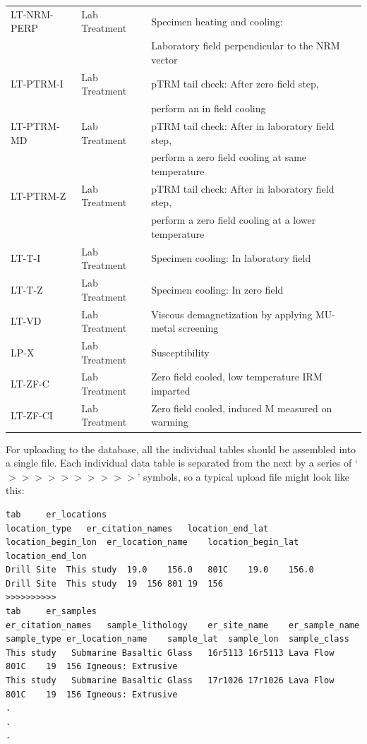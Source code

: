 \documentclass[11pt]{book}
\begin{document}
{\begin{tabular}{lll}
LT-NRM-PERP \qquad & Lab Treatment \qquad & Specimen heating and cooling: \\
\qquad &\qquad &Laboratory field perpendicular to the NRM vector\\
LT-PTRM-I \qquad & Lab Treatment \qquad & pTRM tail check: After zero field step, \\
\qquad &\qquad &perform an in field cooling\\
LT-PTRM-MD \qquad & Lab Treatment \qquad & pTRM tail check: After in laboratory field step, \\
\qquad &\qquad &perform a zero field cooling at same temperature\\
LT-PTRM-Z \qquad & Lab Treatment \qquad & pTRM tail check: After in laboratory field step,\\
\qquad &\qquad & perform a zero field cooling at a lower temperature\\
LT-T-I \qquad & Lab Treatment \qquad & Specimen cooling: In laboratory field\\
LT-T-Z \qquad & Lab Treatment \qquad & Specimen cooling: In zero field\\
LT-VD \qquad & Lab Treatment \qquad & Viscous demagnetization by applying MU-metal screening\\
LP-X \qquad & Lab Treatment \qquad & Susceptibility\\
LT-ZF-C \qquad & Lab Treatment \qquad & Zero field cooled, low temperature IRM imparted\\
LT-ZF-CI \qquad & Lab Treatment \qquad & Zero field cooled, induced M measured on warming\\
\hline
\end{tabular}

For uploading to the database, all the individual tables should be assembled into a single file.  Each individual data table is separated from the next by a series of `$>>>>>>>>>>$' symbols, so a typical upload file might look like this:

\begin{verbatim}
tab 	er_locations
location_type	er_citation_names	location_end_lat	location_begin_lon	er_location_name	location_begin_lat	location_end_lon
Drill Site	This study	19.0	156.0	801C	19.0	156.0
Drill Site	This study	19	156	801	19	156
>>>>>>>>>>
tab 	er_samples
er_citation_names	sample_lithology	er_site_name	er_sample_name	sample_type	er_location_name	sample_lat	sample_lon	sample_class
This study	 Submarine Basaltic Glass	16r5113	16r5113	Lava Flow	801C	19	156	Igneous: Extrusive
This study	 Submarine Basaltic Glass	17r1026	17r1026	Lava Flow	801C	19	156	Igneous: Extrusive
.
.
.
\end{verbatim}

}
\end{document}
